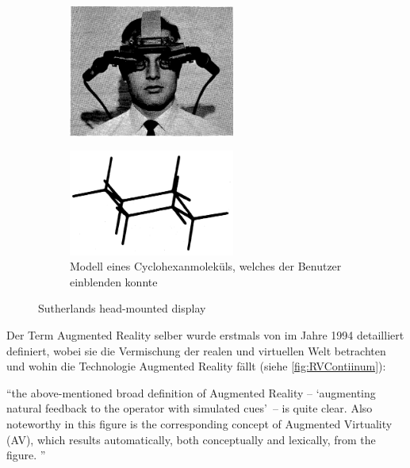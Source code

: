 \documentclass[a4paper]{scrreprt}
\begin{document}
\begin{figure}[h!]
	\centering
	\begin{subfigure}[b]{0.45\textwidth}
		\centering
		\includegraphics[keepaspectratio, width=0.6\textwidth]{Sutherland_HUD.png}
	\end{subfigure}
	\quad
	\begin{subfigure}[b]{0.45\textwidth}
		\centering
		\includegraphics[keepaspectratio, width=0.6\textwidth]{cyclo-hexane_molecule.png}
		\caption{Modell eines Cyclohexanmoleküls, welches der Benutzer einblenden konnte}
	\end{subfigure}
	\caption{Sutherlands head-mounted display}
	\label{fig:FirstHUD}
\end{figure}

Der Term Augmented Reality selber wurde erstmals von \citeauthor{Milgram1994} im Jahre 1994 detailliert definiert, wobei sie die Vermischung der realen und virtuellen Welt betrachten und wohin die Technologie Augmented Reality fällt (siehe \ref{fig:RVContiinum}):

\vspace{1em}

\textquotedblleft the above-mentioned broad definition of Augmented Reality –  \textquoteleft augmenting natural feedback to the operator with simulated cues\textquoteright\ – is quite clear. Also noteworthy in this figure is the corresponding concept of Augmented Virtuality (AV), which results automatically, both conceptually and lexically, from the figure. \textquotedblright\ \parencite{Milgram1994}
\end{document}
